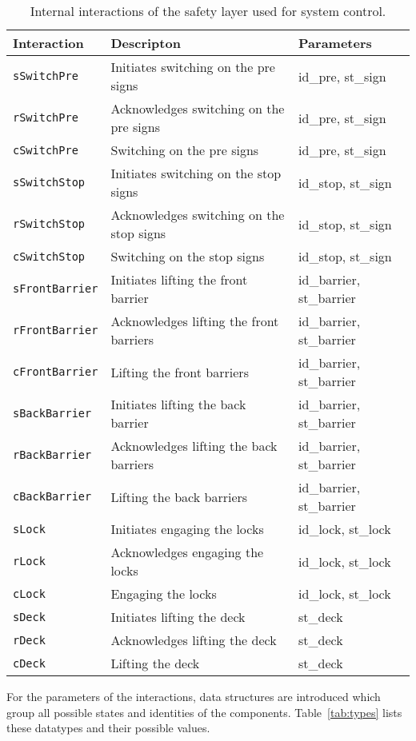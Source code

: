 %
\begin{table}%
\begin{tabular}{lll}
      \textbf{Interaction} &	\textbf{Descripton}	&	\textbf{Parameters}\\
      \hline

      \texttt{sSwitchPre} & Initiates switching on the pre signs & id\_pre, st\_sign\\
      \texttt{rSwitchPre} & Acknowledges switching on the pre signs & id\_pre, st\_sign\\
      \texttt{cSwitchPre} & Switching on the pre signs & id\_pre, st\_sign\\

      \texttt{sSwitchStop} & Initiates switching on the stop signs & id\_stop, st\_sign\\
      \texttt{rSwitchStop} & Acknowledges switching on the stop signs & id\_stop, st\_sign\\
      \texttt{cSwitchStop} & Switching on the stop signs & id\_stop, st\_sign\\

      \texttt{sFrontBarrier} & Initiates lifting the front barrier & id\_barrier, st\_barrier\\
      \texttt{rFrontBarrier} & Acknowledges lifting the front barriers & id\_barrier, st\_barrier\\
      \texttt{cFrontBarrier} & Lifting the front barriers & id\_barrier, st\_barrier\\

      \texttt{sBackBarrier} & Initiates lifting the back barrier & id\_barrier, st\_barrier\\
      \texttt{rBackBarrier} & Acknowledges lifting the back barriers & id\_barrier, st\_barrier\\
      \texttt{cBackBarrier} & Lifting the back barriers & id\_barrier, st\_barrier\\

      \texttt{sLock} & Initiates engaging the locks & id\_lock, st\_lock\\
      \texttt{rLock} & Acknowledges engaging the locks & id\_lock, st\_lock\\
      \texttt{cLock} & Engaging the locks & id\_lock, st\_lock\\

      \texttt{sDeck} & Initiates lifting the deck & st\_deck\\
      \texttt{rDeck} & Acknowledges lifting the deck & st\_deck\\
      \texttt{cDeck} & Lifting the deck & st\_deck\\
\end{tabular}
\caption{Internal interactions of the safety layer used for system control.}
\label{tab:tau}
\end{table}
%
For the parameters of the interactions, data structures are introduced which group all possible states and identities of the components. Table~\ref{tab:types} lists these datatypes and their possible values.

